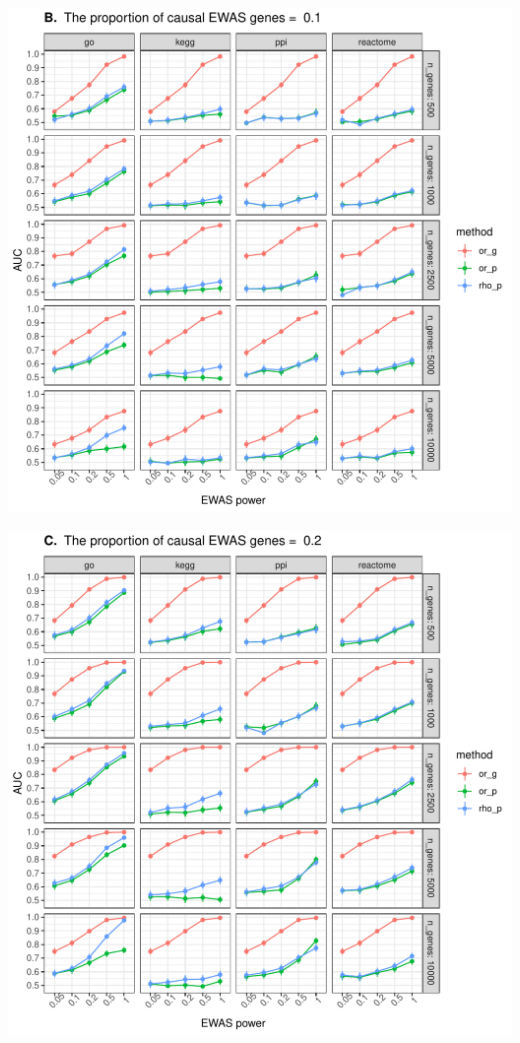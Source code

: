 \documentclass[11pt,oneside]{bristolthesis}
\begin{document}
\begin{center}\includegraphics[width=1\linewidth]{figure/06-ewas_gwas_comparison/method_test_gene_up_all/PEC_0.1} \end{center}
\begin{center}\includegraphics[width=1\linewidth]{figure/06-ewas_gwas_comparison/method_test_gene_up_all/PEC_0.2} \end{center}
\end{document}
